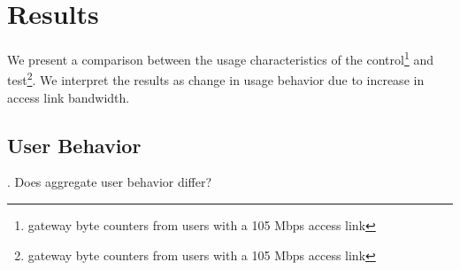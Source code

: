 \section{Results}
\label{sec:results}


We present a comparison between the usage characteristics of the control\footnote{gateway byte counters from users with a 105 Mbps access link} and test\footnote{gateway byte counters from users with a 105 Mbps access link}. We interpret the results as change in usage behavior due to increase in access link bandwidth. %

\subsection{User Behavior}
\label{subsec:behavior}

. Does aggregate user behavior differ?

